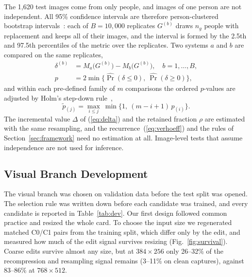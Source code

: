 \documentclass[conference]{IEEEtran}
\begin{document}
The 1{,}620 test images come from only \dsTestPer{} people, and images
of one person are not independent. All 95\% confidence intervals are
therefore person-clustered bootstrap intervals~\cite{efron}: each of
$B=10{,}000$ replicates $G^{(b)}$ draws $n_g$ people with replacement
and keeps all of their images, and the interval is formed by the 2.5th
and 97.5th percentiles of the metric over the replicates. Two systems
$a$ and $b$ are compared on the same replicates,
\begin{equation}
\label{eq:paired}
\begin{aligned}
\delta^{(b)}&=M_a\big(G^{(b)}\big)-M_b\big(G^{(b)}\big),\quad b=1,\dots,B,\\
p&=2\min\big\{\widehat{\Pr}(\delta\le0),\ \widehat{\Pr}(\delta\ge0)\big\},
\end{aligned}
\end{equation}
and within each pre-defined family of $m$ comparisons the ordered
$p$-values are adjusted by Holm's step-down rule~\cite{holm},
\begin{equation}
\label{eq:holm}
\tilde{p}_{(j)}=\max_{i\le j}\ \min\big\{1,\ (m-i+1)\,p_{(i)}\big\}.
\end{equation}
The incremental value $\Delta$ of (\ref{eq:delta}) and the retained
fraction $\rho$ are estimated with the same resampling, and the
recurrence~(\ref{eq:verhoeff}) and the rules of
Section~\ref{sec:framework} need no estimation at all. Image-level tests
that assume independence are not used for inference.

\subsection{Visual Branch Development}
\label{sec:dev}

The visual branch was chosen on validation data before the test split
was opened. The selection rule was written down before each candidate
was trained, and every candidate is reported in
Table~\ref{tab:dev}. Our first design followed common practice and
resized the whole card. To choose the input size we regenerated matched
C0/C1 pairs from the training split, which differ only by the edit, and
measured how much of the edit signal survives resizing
(Fig.~\ref{fig:survival}). Coarse edits survive almost any size, but at
$384{\times}256$ only 26--32\% of the recompression and resampling
signal remains (3--11\% on clean captures), against 83--86\% at
$768{\times}512$.
\end{document}
